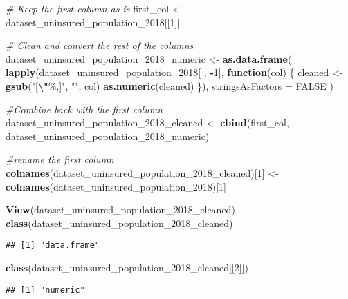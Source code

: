 \documentclass[
]{article}
\newenvironment{Shaded}{\begin{snugshade}}{\end{snugshade}}
\newcommand{\AttributeTok}[1]{\textcolor[rgb]{0.13,0.29,0.53}{#1}}
\newcommand{\CommentTok}[1]{\textcolor[rgb]{0.56,0.35,0.01}{\textit{#1}}}
\newcommand{\ConstantTok}[1]{\textcolor[rgb]{0.56,0.35,0.01}{#1}}
\newcommand{\ControlFlowTok}[1]{\textcolor[rgb]{0.13,0.29,0.53}{\textbf{#1}}}
\newcommand{\DecValTok}[1]{\textcolor[rgb]{0.00,0.00,0.81}{#1}}
\newcommand{\FunctionTok}[1]{\textcolor[rgb]{0.13,0.29,0.53}{\textbf{#1}}}
\newcommand{\NormalTok}[1]{#1}
\newcommand{\OtherTok}[1]{\textcolor[rgb]{0.56,0.35,0.01}{#1}}
\newcommand{\SpecialCharTok}[1]{\textcolor[rgb]{0.81,0.36,0.00}{\textbf{#1}}}
\newcommand{\StringTok}[1]{\textcolor[rgb]{0.31,0.60,0.02}{#1}}
\begin{document}
\begin{Shaded}
\begin{Highlighting}[]
\CommentTok{\# Keep the first column as{-}is}
\NormalTok{first\_col }\OtherTok{\textless{}{-}}\NormalTok{ dataset\_uninsured\_population\_2018[[}\DecValTok{1}\NormalTok{]]}

\CommentTok{\# Clean and convert the rest of the columns}
\NormalTok{dataset\_uninsured\_population\_2018\_numeric }\OtherTok{\textless{}{-}} \FunctionTok{as.data.frame}\NormalTok{(}
  \FunctionTok{lapply}\NormalTok{(dataset\_uninsured\_population\_2018[ , }\SpecialCharTok{{-}}\DecValTok{1}\NormalTok{], }\ControlFlowTok{function}\NormalTok{(col) \{}
\NormalTok{    cleaned }\OtherTok{\textless{}{-}} \FunctionTok{gsub}\NormalTok{(}\StringTok{"[}\SpecialCharTok{\textbackslash{}"}\StringTok{\%,]"}\NormalTok{, }\StringTok{""}\NormalTok{, col)}
    \FunctionTok{as.numeric}\NormalTok{(cleaned)}
\NormalTok{  \}),}
  \AttributeTok{stringsAsFactors =} \ConstantTok{FALSE}
\NormalTok{)}

\CommentTok{\#Combine back with the first column}
\NormalTok{dataset\_uninsured\_population\_2018\_cleaned }\OtherTok{\textless{}{-}} \FunctionTok{cbind}\NormalTok{(first\_col, dataset\_uninsured\_population\_2018\_numeric)}

\CommentTok{\#rename the first column}
\FunctionTok{colnames}\NormalTok{(dataset\_uninsured\_population\_2018\_cleaned)[}\DecValTok{1}\NormalTok{] }\OtherTok{\textless{}{-}} \FunctionTok{colnames}\NormalTok{(dataset\_uninsured\_population\_2018)[}\DecValTok{1}\NormalTok{]}

\FunctionTok{View}\NormalTok{(dataset\_uninsured\_population\_2018\_cleaned)}
\FunctionTok{class}\NormalTok{(dataset\_uninsured\_population\_2018\_cleaned)}
\end{Highlighting}
\end{Shaded}

\begin{verbatim}
## [1] "data.frame"
\end{verbatim}

\begin{Shaded}
\begin{Highlighting}[]
\FunctionTok{class}\NormalTok{(dataset\_uninsured\_population\_2018\_cleaned[[}\DecValTok{2}\NormalTok{]])}
\end{Highlighting}
\end{Shaded}

\begin{verbatim}
## [1] "numeric"
\end{verbatim}
\end{document}

